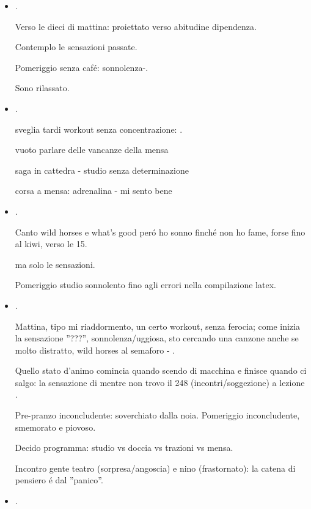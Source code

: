 \begin{itemize}
\item {}.

Verso le dieci di mattina: proiettato verso abitudine dipendenza.

Contemplo le sensazioni passate.

Pomeriggio senza caf\'e: sonnolenza-.

Sono rilassato.


\item {}.

sveglia tardi workout senza concentrazione: .

vuoto parlare delle vancanze della mensa

saga in cattedra - studio senza determinazione

corsa a mensa: adrenalina - mi sento bene

\item {}.

Canto wild horses e what's good per\'o ho sonno finch\'e non ho fame, forse fino al kiwi, verso le 15.

 ma solo le sensazioni.

Pomeriggio studio sonnolento fino agli errori nella compilazione latex.

\item {}.

Mattina, tipo mi riaddormento, un certo workout, senza ferocia; come inizia la sensazione ''???'', sonnolenza/uggiosa, sto cercando una canzone anche se molto distratto, wild horses al semaforo - .

Quello stato d'animo comincia quando scendo di macchina e finisce quando ci salgo: la sensazione di  mentre non trovo il 248 (incontri/soggezione) a lezione .

Pre-pranzo inconcludente: soverchiato dalla noia. Pomeriggio inconcludente, smemorato e piovoso.

Decido programma: studio vs doccia vs trazioni vs mensa.

Incontro gente teatro (sorpresa/angoscia) e nino (frastornato):
la catena di pensiero \'e  dal ''panico''.

\item {}.


\end{itemize}
